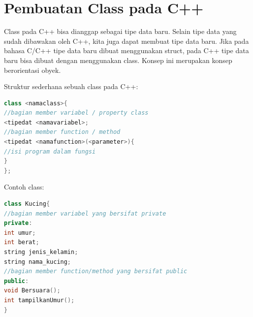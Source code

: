\section{Pembuatan Class pada C++}\label{pembuatan-class-pada-c}

Class pada C++ bisa dianggap sebagai tipe data baru. Selain tipe data
yang sudah dibawakan oleh C++, kita juga dapat membuat tipe data baru.
Jika pada bahasa C/C++ tipe data baru dibuat menggunakan struct, pada
C++ tipe data baru bisa dibuat dengan menggunakan class. Konsep ini
merupakan konsep berorientasi obyek.

Struktur sederhana sebuah class pada C++:

\begin{lstlisting}[language=c++, numbers=none]
class <namaclass>{
//bagian member variabel / property class
<tipedat <namavariabel>;
//bagian member function / method
<tipedat <namafunction>(<parameter>){
//isi program dalam fungsi
}
};
\end{lstlisting}

Contoh class:

\begin{lstlisting}[language=c++, numbers=none]
class Kucing{
//bagian member variabel yang bersifat private
private:
int umur;
int berat;
string jenis_kelamin;
string nama_kucing;
//bagian member function/method yang bersifat public
public:
void Bersuara();
int tampilkanUmur();
}
\end{lstlisting}

